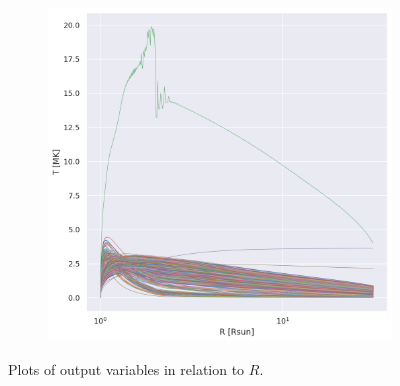 \begin{figure}[!ht]
\begin{subfigure}[b]{0.32\textwidth}
     \end{subfigure}
     \hfill
    \begin{subfigure}[b]{0.32\textwidth}
         \centering
         \includegraphics[width=\textwidth]{figures/temperature_radius.png}
     \end{subfigure}
     \hfill
    \caption{Plots of output variables in relation to $R$.}
    \label{fig:output_distr_plot}
\end{figure}

